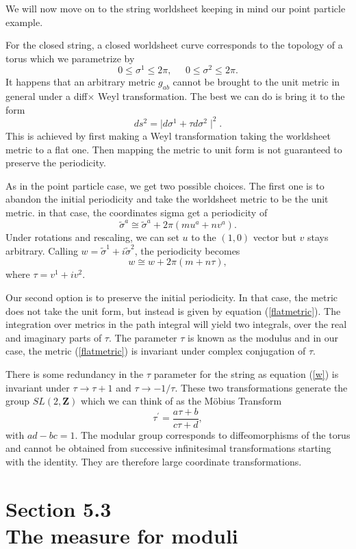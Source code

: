\documentclass[12pt,letterpaper]{article}
\def\be{\begin{equation}}
\def\ee{\end{equation}}
\begin{document}
We will now move on to the string worldsheet keeping in mind our point particle example.

For the closed string, a closed worldsheet curve corresponds to the topology of a torus which we parametrize by 
\be 
0\le \sigma^{1} \le 2\pi,\;\;\;\;\;0\le \sigma^{2} \le 2\pi.
\ee
It happens that an arbitrary metric $g_{ab}$ cannot be brought to the unit metric in general under a diff$\times$ Weyl transformation.  The best we can do is bring it to the form
\be \label{flatmetric}
ds^{2} = \mid d\sigma^{1}+\tau d\sigma^{2}\mid^{2}.
\ee
This is achieved by first making a Weyl transformation taking the worldsheet metric to a flat one.  Then mapping the metric to unit form is not guaranteed to preserve the periodicity.  

As in the point particle case, we get two possible choices.  The first one is to abandon the initial periodicity and take the worldsheet metric to be the unit metric.  in that case, the coordinates sigma get a periodicity of
\be 
\tilde{\sigma}^{a} \cong \tilde{\sigma}^{a} + 2\pi\left(mu^{a}+nv^{a}\right).
\ee
Under rotations and rescaling, we can set $u$ to the $(1,0)$ vector but $v$ stays arbitrary.  Calling $w = \tilde{\sigma}^{1}+i\tilde{\sigma}^{2}$, the periodicity becomes
\be \label{w}
w \cong w + 2\pi(m+n\tau),
\ee
where $\tau = v^{1}+iv^{2}$.

Our second option is to preserve the initial periodicity.  In that case, the metric does not take the unit form, but instead is given by equation (\ref{flatmetric}).  The integration over metrics in the path integral will yield two integrals, over the real and imaginary parts of $\tau$. The parameter $\tau$ is known as the modulus and in our case, the metric (\ref{flatmetric}) is invariant under complex conjugation of $\tau$.  

There is some redundancy in the $\tau$ parameter for the string as equation (\ref{w}) is invariant under $\tau\rightarrow \tau + 1$ and $\tau \rightarrow -1/\tau$.  These two transformations generate the group $SL(2,\mathbf{Z})$ which we can think of as the Möbius Transform 
\be 
\tau^{\prime} = \frac{a\tau + b}{c\tau + d},
\ee
with $ad-bc=1$.  The modular group corresponds to diffeomorphisms of the torus and cannot be obtained from successive infinitesimal transformations starting with the identity.  They are therefore large coordinate transformations.

\newpage
\section*{Section 5.3 \\The measure for moduli}
\end{document}
